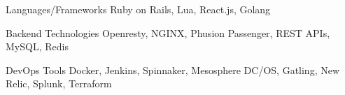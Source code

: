

\begin{cvskills}

  \cvskill
    {Languages/Frameworks} %
    {Ruby on Rails, Lua, React.js, Golang} %


  \cvskill
    {Backend Technologies} %
    {Openresty, NGINX, Phusion Passenger, REST APIs, MySQL, Redis} %

  \cvskill
    {DevOps Tools} %
    {Docker, Jenkins, Spinnaker, Mesosphere DC/OS, Gatling, New Relic, Splunk, Terraform} %

\end{cvskills}
